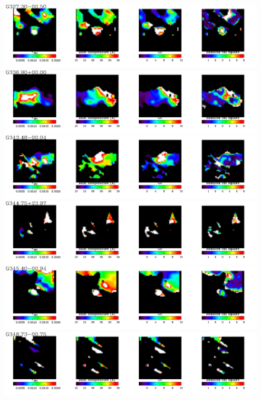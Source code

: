   \begin{figure}
\centering
\includegraphics[trim=0 2mm 0 0, clip, width=190mm]{appA/appA_84.pdf}
\includegraphics[trim=0 2mm 0 0, clip, width=190mm]{appA/appA_85.pdf}
\includegraphics[trim=0 2mm 0 0, clip, width=190mm]{appA/appA_86.pdf}
\includegraphics[trim=0 2mm 0 0, clip, width=190mm]{appA/appA_87.pdf}
\includegraphics[trim=0 2mm 0 0, clip, width=190mm]{appA/appA_88.pdf}
\includegraphics[trim=0 2mm 0 0, clip, width=190mm]{appA/appA_89.pdf}
  \end{figure}
  
